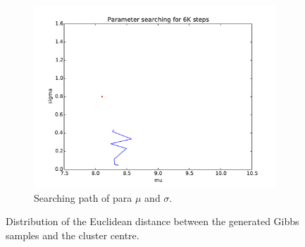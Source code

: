 \begin{figure}[hbt]
\begin{subfigure}[t]{0.18\textwidth}
			\includegraphics[width=\textwidth]{pics_sdbn/cdk_para.pdf}
		    \caption{Searching path of para $\mu$ and $\sigma$.}
		\end{subfigure}	
  \caption{
  Distribution of the Euclidean distance between the generated Gibbs samples and the cluster centre.
  }
  \label{Fig:dis}
\end{figure}

